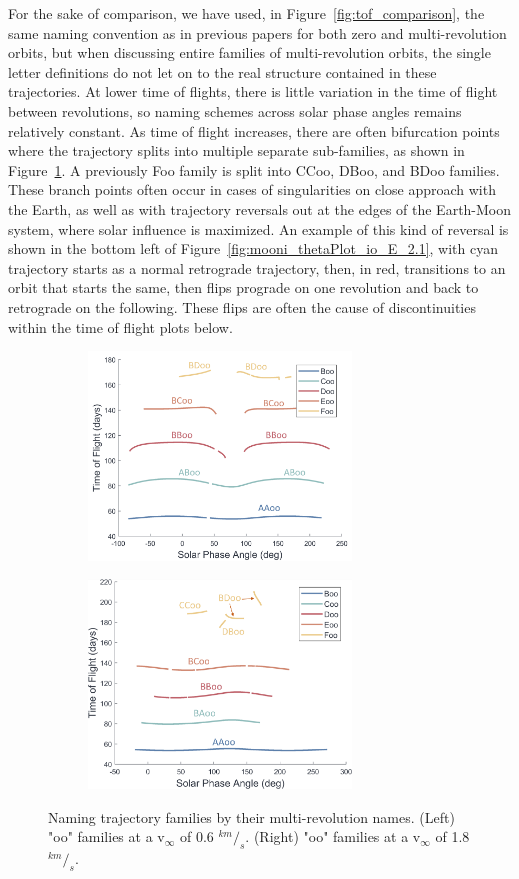 \documentclass[letterpaper, paper,11pt]{AAS}	%
\begin{document}
For the sake of comparison, we have used, in Figure~\ref{fig:tof_comparison}, the same naming convention as in previous papers for both zero and multi-revolution orbits, but when discussing entire families of multi-revolution orbits, the single letter definitions do not let on to the real structure contained in these trajectories. At lower time of flights, there is little variation in the time of flight between revolutions, so naming schemes across solar phase angles remains relatively constant. As time of flight increases, there are often bifurcation points where the trajectory splits into multiple separate sub-families, as shown in Figure~\ref{fig:state_famoo_vinf0.6_tof}. A previously Foo family is split into CCoo, DBoo, and BDoo families. These branch points often occur in cases of singularities on close approach with the Earth, as well as with trajectory reversals out at the edges of the Earth-Moon system, where solar influence is maximized. An example of this kind of reversal is shown in the bottom left of Figure~\ref{fig:mooni_thetaPlot_io_E_2.1}, with cyan trajectory starts as a normal retrograde trajectory, then, in red, transitions to an orbit that starts the same, then flips prograde on one revolution and back to retrograde on the following. These flips are often the cause of discontinuities within the time of flight plots below.

\begin{figure}[h!]
    \centering
    \begin{subfigure}
        \centering
        \includegraphics[width=2.75in]{./etc/names.png}     
    \end{subfigure}
    \begin{subfigure}
        \centering
        \includegraphics[width=2.75in]{./etc/names2.png}     
    \end{subfigure}
    \caption{Naming trajectory families by their multi-revolution names. (Left) "oo" families at a v\(_\infty\) of 0.6 \(^{km}/_s\). (Right) "oo" families at a v\(_\infty\) of 1.8 \(^{km}/_s\).}
    \label{fig:state_famoo_vinf0.6_tof}
\end{figure}
\end{document}
